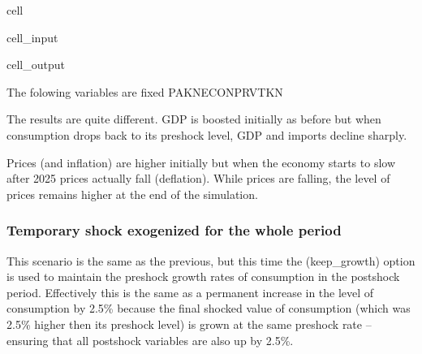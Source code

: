 \documentclass[letterpaper,10pt,english]{jupyterBook}
\begin{document}
\begin{sphinxuseclass}{cell}
\begin{sphinxVerbatimInput}
\begin{sphinxuseclass}{cell_input}
\end{sphinxuseclass}\end{sphinxVerbatimInput}
\begin{sphinxVerbatimOutput}

\begin{sphinxuseclass}{cell_output}
\begin{sphinxVerbatim}[commandchars=\\\{\}]
The folowing variables are fixed
PAKNECONPRVTKN
\end{sphinxVerbatim}

\noindent{}

\end{sphinxuseclass}\end{sphinxVerbatimOutput}

\end{sphinxuseclass}
\sphinxAtStartPar
The results are quite different.  GDP is boosted initially as before but when consumption drops back to its pre\sphinxhyphen{}shock level, GDP and imports decline sharply.

\sphinxAtStartPar
Prices (and inflation) are higher initially but when the economy starts to slow after 2025 prices actually fall (deflation). While prices are falling, the level of prices remains higher at the end of the simulation.


\subsubsection{Temporary shock exogenized for the whole period}
\label{\detokenize{content/05_WBModels/ScenarioAnalysis:temporary-shock-exogenized-for-the-whole-period}}
\sphinxAtStartPar
This scenario is the same as the previous, but this time the  (keep\_growth) option is used to maintain the pre\sphinxhyphen{}shock growth rates of consumption in the post\sphinxhyphen{}shock period.  Effectively this is the same as a permanent increase in the level of consumption by 2.5\% because the final shocked value of consumption (which was 2.5\% higher then its pre\sphinxhyphen{}shock level) is grown at the same pre\sphinxhyphen{}shock rate – ensuring that all post\sphinxhyphen{}shock variables are also up by 2.5\%.
\end{document}
